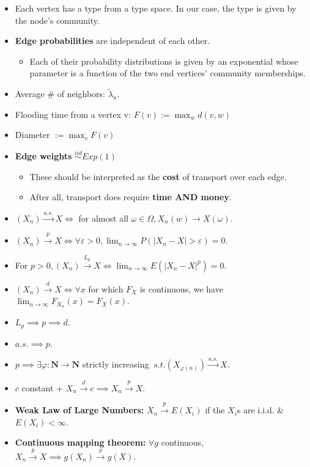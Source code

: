 \documentclass[
  letterpaper,
  DIV=11,
  numbers=noendperiod]{scrartcl}
\providecommand{\tightlist}{%
  \setlength{\itemsep}{0pt}\setlength{\parskip}{0pt}}\usepackage{longtable,booktabs,array}
\begin{document}
\begin{itemize}
\item
  Each vertex has a type from a type space. In our case, the type is
  given by the node's community.
\item
  \textbf{Edge probabilities} are independent of each other.

  \begin{itemize}
  \tightlist
  \item
    Each of their probability distributions is given by an exponential
    whose parameter is a function of the two end vertices' community
    memberships.
  \end{itemize}
\item
  Average \# of neighbors: \(\tilde\lambda_n\).
\item
  Flooding time from a vertex v: \(F(v):=\max_w d(v, w)\)
\item
  Diameter \(:= \max_v F(v)\)
\item
  \textbf{Edge weights} \(\overset{iid}{\sim} Exp(1)\)

  \begin{itemize}
  \item
    These should be interpreted as the \textbf{cost} of transport over
    each edge.
  \item
    After all, transport does require \textbf{time AND money}.
  \end{itemize}
\end{itemize}

\begin{itemize}
\item
  \((X_n) \xrightarrow{a.s.} X \iff\) for almost all
  \(\omega \in \Omega, X_n(w) \rightarrow X(\omega)\).
\item
  \((X_n) \xrightarrow{p} X \iff \forall \varepsilon > 0, \lim_{n \to \infty} P(|X_n - X| > \varepsilon) = 0.\)
\item
  For
  \(p > 0, (X_n) \xrightarrow{L_p} X \iff \lim_{n \to \infty} E(|X_n - X|^p) = 0.\)
\item
  \((X_n) \xrightarrow{d} X \iff \forall x\) for which \(F_X\) is
  continuous, we have \(\lim_{n \to \infty} F_{X_n}(x) = F_X(x).\)
\item
  \(L_p \implies p \implies d.\)
\item
  \(a.s. \implies p.\)
\item
  \(p \implies \exists \varphi: \mathbf{N} \to \mathbf{N}\) strictly
  increasing \(\: s.t. (X_{\varphi(n)}) \xrightarrow{a.s.} X.\)
\item
  \(c\) constant \(+\)
  \(X_n \xrightarrow{d} c \implies X_n \xrightarrow{p} X.\)
\item
  \textbf{Weak Law of Large Numbers:}
  \(\overline{X}_n \xrightarrow{p} E(X_i)\) if the \(X_i\)s are i.i.d.
  \& \(E(X_i) < \infty\).
\item
  \textbf{Continuous mapping theorem:} \(\forall g\) continuous,
  \(X_n \xrightarrow{p} X \implies g(X_n) \xrightarrow{p} g(X).\)
\end{itemize}
\end{document}

